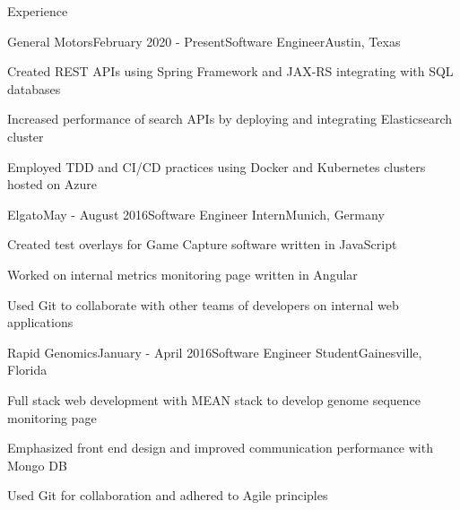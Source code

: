 \documentclass[
	11pt, %
]{resume} %
\begin{document}
\begin{rSection}{Experience}

	\begin{rSubsection}{General Motors}{February 2020 - Present}{Software Engineer}{Austin, Texas}
		\item Created REST APIs using Spring Framework and JAX-RS integrating with SQL databases
		\item Increased performance of search APIs by deploying and integrating Elasticsearch cluster
		\item Employed TDD and CI/CD practices using Docker and Kubernetes clusters hosted on Azure
	\end{rSubsection}


	\begin{rSubsection}{Elgato}{May - August 2016}{Software Engineer Intern}{Munich, Germany}
		\item Created test overlays for Game Capture software written in JavaScript
		\item Worked on internal metrics monitoring page written in Angular
		\item Used Git to collaborate with other teams of developers on internal web applications
	\end{rSubsection}


	\begin{rSubsection}{Rapid Genomics}{January - April 2016}{Software Engineer Student}{Gainesville, Florida}
		\item Full stack web development with MEAN stack to develop genome sequence monitoring page
		\item Emphasized front end design and improved communication performance with Mongo DB
		\item Used Git for collaboration and adhered to Agile principles
	\end{rSubsection}

\end{rSection}
\end{document}
